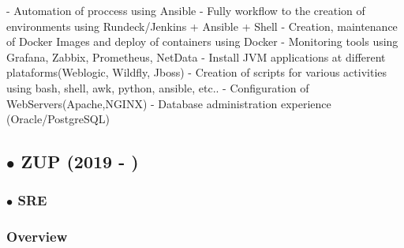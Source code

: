 \documentclass{article}
\begin{document}
- Automation of proccess using Ansible \newline
- Fully workflow to the creation of environments using Rundeck/Jenkins + Ansible + Shell \newline
- Creation, maintenance of Docker Images and deploy of containers using Docker \newline
- Monitoring tools using Grafana, Zabbix, Prometheus, NetData \newline
- Install JVM applications at different plataforms(Weblogic, Wildfly, Jboss) \newline
- Creation of scripts for various activities using bash, shell, awk, python, ansible, etc.. \newline
- Configuration of WebServers(Apache,NGINX) \newline
- Database administration experience (Oracle/PostgreSQL) \newline

\subsection{$\bullet$ ZUP (2019 - )}

\subsubsection{$\bullet$ SRE}

\subsubsection{Overview \\}
\end{document}
